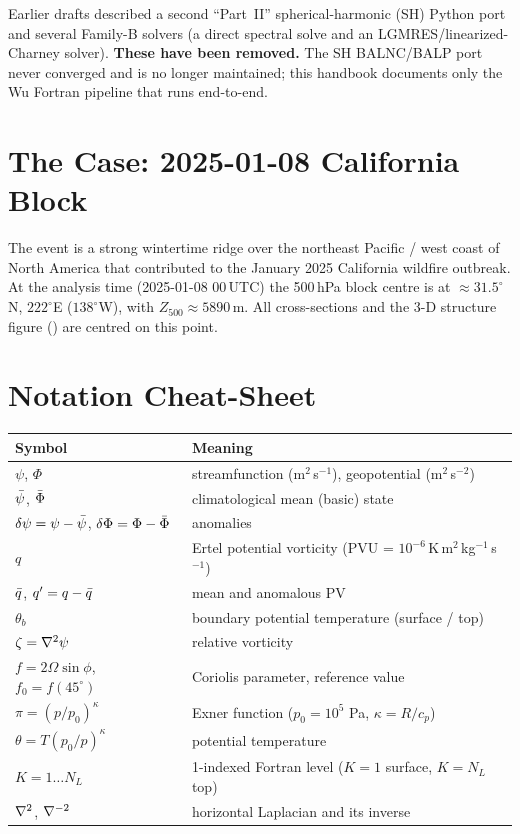 \begin{warnbox}
Earlier drafts described a second ``Part~II'' spherical-harmonic (SH)
Python port and several Family-B solvers (a direct spectral solve and an
LGMRES/linearized-Charney solver).  \textbf{These have been removed.}
The SH BALNC/BALP port never converged and is no longer maintained;
this handbook documents only the Wu Fortran pipeline that runs
end-to-end.
\end{warnbox}

\section{The Case: 2025-01-08 California Block}

The event is a strong wintertime ridge over the northeast Pacific / west
coast of North America that contributed to the January 2025 California
wildfire outbreak.  At the analysis time (2025-01-08 00\,UTC) the
500\,hPa block centre is at $\approx 31.5^\circ$N, $222^\circ$E
($138^\circ$W), with $Z_{500}\approx 5890$\,m.  All cross-sections and
the 3-D structure figure () are centred on this point.

\section{Notation Cheat-Sheet}

\begin{center}
\begin{tabular}{ll}
  \toprule
  Symbol & Meaning \\
  \midrule
  $\psi$, $\Phi$ & streamfunction (m$^2$\,s$^{-1}$), geopotential (m$^2$\,s$^{-2}$) \\
  $\bar{\psi}$, $\bar{\Phi}$ & climatological mean (basic) state \\
  $\delta\psi=\psi-\bar{\psi}$, $\delta\Phi=\Phi-\bar{\Phi}$ & anomalies \\
  $q$ & Ertel potential vorticity (PVU = $10^{-6}\,$K\,m$^2$\,kg$^{-1}$\,s$^{-1}$) \\
  $\bar{q}$, $q^{\prime}=q-\bar{q}$ & mean and anomalous PV \\
  $\theta_b$ & boundary potential temperature (surface / top) \\
  $\zeta=\nabla^{2}\psi$ & relative vorticity \\
  $f=2\Omega\sin\phi$, $f_0=f(45^\circ)$ & Coriolis parameter, reference value \\
  $\pi=(p/p_0)^{\kappa}$ & Exner function ($p_0=10^{5}$ Pa, $\kappa=R/c_p$) \\
  $\theta=T(p_0/p)^{\kappa}$ & potential temperature \\
  $K=1\ldots N_L$ & 1-indexed Fortran level ($K{=}1$ surface, $K{=}N_L$ top) \\
  $\nabla^{2}$, $\nabla^{-2}$ & horizontal Laplacian and its inverse \\
  \bottomrule
\end{tabular}
\end{center}

